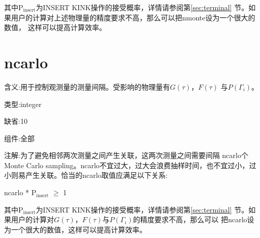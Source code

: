 其中P$_{\text{insert}}$为INSERT KINK操作的接受概率，详情请参阅第\ref{sec:terminal}
节。如果用户的计算对上述物理量的精度要求不高，那么可以把nmonte设为一个很大的数值，
这样可以提高计算效率。

\section{ncarlo}
\label{sec:ncarlo}

{\color{red}含义}:用于控制观测量的测量间隔。受影响的物理量有$G(\tau)$，$F(\tau)$
与$P(\Gamma_i)$。

{\color{green}类型}:integer

{\color{blue}缺省}:10

{\color{brown}组件}:全部

{\color{purple}注解}:为了避免相邻两次测量之间产生关联，这两次测量之间需要间隔
ncarlo个Monte Carlo sampling。ncarlo不宜过大，过大会浪费抽样时间，也不宜过小，过
小则易产生关联。恰当的ncarlo取值应满足以下关系:

ncarlo * P$_{\text{insert}}$ $\ge$ 1

其中P$_{\text{insert}}$为INSERT KINK操作的接受概率，详情请参阅第\ref{sec:terminal}
节。如果用户的计算对$G(\tau)$，$F(\tau)$与$P(\Gamma_i)$的精度要求不高，那么可以
把ncarlo设为一个很大的数值，这样可以提高计算效率。
